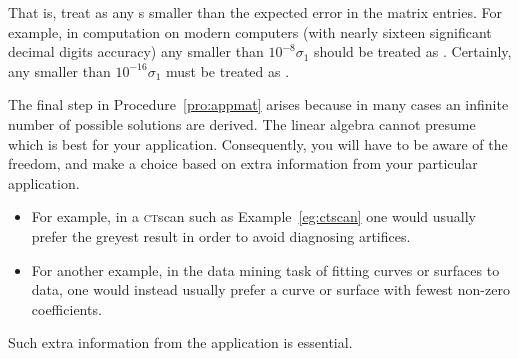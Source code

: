 That is, treat as  any s smaller than the expected error in the matrix entries.
For example, in computation on modern computers (with nearly sixteen significant decimal digits accuracy) any  smaller than \(10^{-8}\sigma_1\) should be treated as .
Certainly, any smaller than \(10^{-16}\sigma_1\) must be treated as .

The final step in Procedure~\ref{pro:appmat} arises because in many cases an infinite number of possible solutions are derived.
The linear algebra cannot presume which is best for your application.
Consequently, you will have to be aware of the freedom, and make a choice based on extra information from your particular application.
\begin{itemize}
\item For example, in a \textsc{ct}scan such as Example~\ref{eg:ctscan} one would usually prefer the greyest result in order to avoid diagnosing artifices.
\item For another example, in the data mining task of fitting curves or surfaces to data, one would instead usually prefer a curve or surface with fewest non-zero coefficients.
\end{itemize}
Such extra information from the application is essential. 






